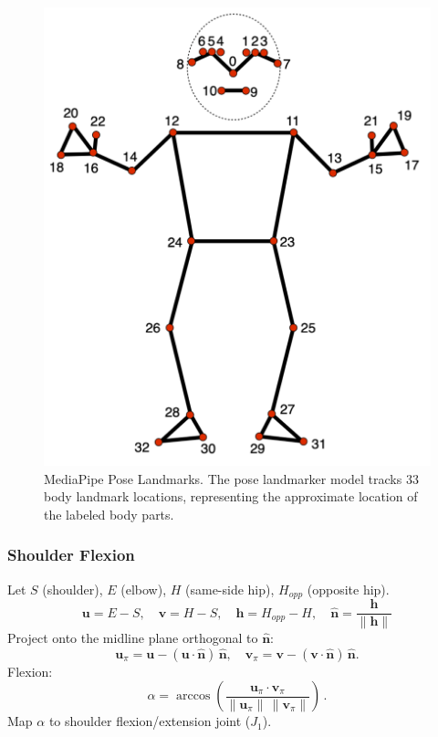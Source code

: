 \documentclass[sigconf]{acmart}
\begin{document}
\begin{figure}[htbp]
  \centering
  \includegraphics[width=\linewidth]{assets/pose-landmarks.png}
  \caption{MediaPipe Pose Landmarks. The pose landmarker model tracks 33 body landmark locations, representing the approximate location of the labeled body parts.}
  \label{fig:pose-landmarks}
\end{figure}

\subsubsection{Shoulder Flexion}
Let $S$ (shoulder), $E$ (elbow), $H$ (same-side hip), $H_{opp}$ (opposite hip).
\begin{displaymath}
  \mathbf{u}=E-S,\quad \mathbf{v}=H-S,\quad \mathbf{h}=H_{opp}-H,\quad \hat{\mathbf{n}}=\frac{\mathbf{h}}{\lVert\mathbf{h}\rVert}
\end{displaymath}
Project onto the midline plane orthogonal to $\hat{\mathbf{n}}$:
\begin{displaymath}
\mathbf{u}_\pi=\mathbf{u}-(\mathbf{u}\cdot\hat{\mathbf{n}})\,\hat{\mathbf{n}},\quad
\mathbf{v}_\pi=\mathbf{v}-(\mathbf{v}\cdot\hat{\mathbf{n}})\,\hat{\mathbf{n}}.
\end{displaymath}
Flexion:
\begin{equation}
\alpha=\arccos \!\left( \frac{\mathbf{u}_\pi \cdot \mathbf{v}_\pi}{\lVert\mathbf{u}_\pi\rVert\, \lVert\mathbf{v}_\pi\rVert} \right)\,.
\end{equation}
Map $\alpha$ to shoulder flexion/extension joint ($J_1$).
\end{document}

